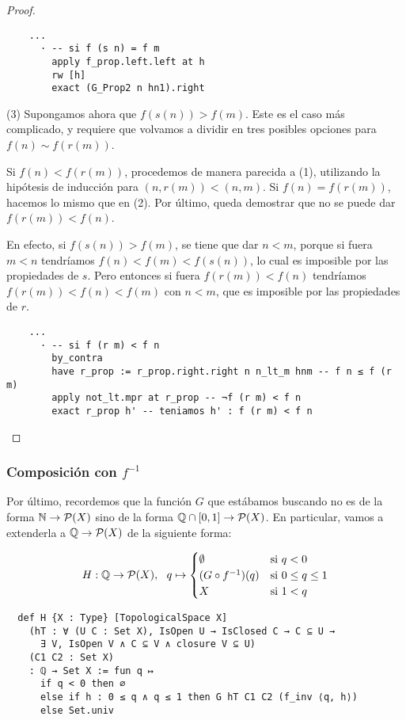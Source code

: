 \begin{proof}
  \begin{lstlisting}
    ...
      · -- si f (s n) = f m
        apply f_prop.left.left at h
        rw [h]
        exact (G_Prop2 n hn1).right \end{lstlisting}

  (3) Supongamos ahora que $f(s(n))>f(m)$. Este es el caso más complicado, y requiere que volvamos a dividir en tres posibles opciones para $f(n) \sim f(r(m))$.
  
  Si $f(n) < f(r(m))$, procedemos de manera parecida a (1), utilizando la hipótesis de inducción para $(n, r(m)) < (n, m)$. Si $f(n) = f(r(m))$, hacemos lo mismo que en (2). Por último, queda demostrar que no se puede dar $f(r(m)) < f(n)$.

  En efecto, si $f(s(n))>f(m)$, se tiene que dar $n < m$, porque si fuera $m<n$ tendríamos $f(n) < f(m) < f(s(n))$, lo cual es imposible por las propiedades de $s$. Pero entonces si fuera $f(r(m)) < f(n)$ tendríamos $f(r(m)) < f(n) < f(m)$ con $n < m$, que es imposible por las propiedades de $r$.

  \begin{lstlisting}
    ...
      · -- si f (r m) < f n
        by_contra
        have r_prop := r_prop.right.right n n_lt_m hnm -- f n ≤ f (r m)
        apply not_lt.mpr at r_prop -- ¬f (r m) < f n
        exact r_prop h' -- teniamos h' : f (r m) < f n \end{lstlisting}
\end{proof}


\subsubsection{Composición con $f^{-1}$}

Por último, recordemos que la función $G$ que estábamos buscando no es de la forma $\mathbb{N} \to \mathcal{P}(X)$ sino de la forma $\mathbb{Q} \cap [0, 1] \to \mathcal{P}(X)$. En particular, vamos a extenderla a $\mathbb{Q} \to \mathcal{P}(X)$ de la siguiente forma:

$$
H : \mathbb{Q} \to \mathcal{P}(X), ~~ q \mapsto
\begin{cases}
\emptyset & \text{si } q < 0 \\
(G \circ f^{-1})(q) & \text{si } 0 \leq q \leq 1 \\
X & \text{si } 1 < q
\end{cases}
$$

\begin{lstlisting}
  def H {X : Type} [TopologicalSpace X]
    (hT : ∀ (U C : Set X), IsOpen U → IsClosed C → C ⊆ U →
      ∃ V, IsOpen V ∧ C ⊆ V ∧ closure V ⊆ U)
    (C1 C2 : Set X)
    : ℚ → Set X := fun q ↦
      if q < 0 then ∅
      else if h : 0 ≤ q ∧ q ≤ 1 then G hT C1 C2 (f_inv ⟨q, h⟩)
      else Set.univ
\end{lstlisting}

